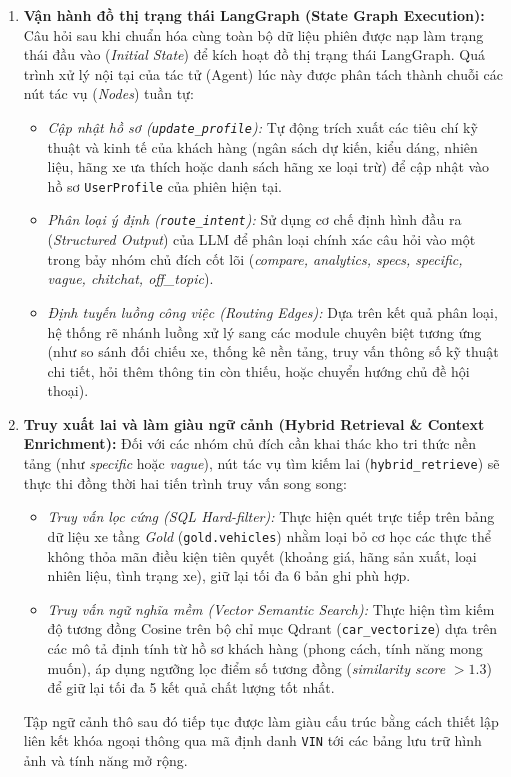 \begin{enumerate}
    \item \textbf{Vận hành đồ thị trạng thái LangGraph (State Graph Execution):} Câu hỏi sau khi chuẩn hóa cùng toàn bộ dữ liệu phiên được nạp làm trạng thái đầu vào (\textit{Initial State}) để kích hoạt đồ thị trạng thái LangGraph. Quá trình xử lý nội tại của tác tử (Agent) lúc này được phân tách thành chuỗi các nút tác vụ (\textit{Nodes}) tuần tự:
    \begin{itemize}
        \item \textit{Cập nhật hồ sơ (\texttt{update\_profile}):} Tự động trích xuất các tiêu chí kỹ thuật và kinh tế của khách hàng (ngân sách dự kiến, kiểu dáng, nhiên liệu, hãng xe ưa thích hoặc danh sách hãng xe loại trừ) để cập nhật vào hồ sơ \texttt{UserProfile} của phiên hiện tại.
        \item \textit{Phân loại ý định (\texttt{route\_intent}):} Sử dụng cơ chế định hình đầu ra (\textit{Structured Output}) của LLM để phân loại chính xác câu hỏi vào một trong bảy nhóm chủ đích cốt lõi (\textit{compare, analytics, specs, specific, vague, chitchat, off\_topic}).
        \item \textit{Định tuyến luồng công việc (Routing Edges):} Dựa trên kết quả phân loại, hệ thống rẽ nhánh luồng xử lý sang các module chuyên biệt tương ứng (như so sánh đối chiếu xe, thống kê nền tảng, truy vấn thông số kỹ thuật chi tiết, hỏi thêm thông tin còn thiếu, hoặc chuyển hướng chủ đề hội thoại).
    \end{itemize}
    
    \item \textbf{Truy xuất lai và làm giàu ngữ cảnh (Hybrid Retrieval \& Context Enrichment):} Đối với các nhóm chủ đích cần khai thác kho tri thức nền tảng (như \textit{specific} hoặc \textit{vague}), nút tác vụ tìm kiếm lai (\texttt{hybrid\_retrieve}) sẽ thực thi đồng thời hai tiến trình truy vấn song song:
    \begin{itemize}
        \item \textit{Truy vấn lọc cứng (SQL Hard-filter):} Thực hiện quét trực tiếp trên bảng dữ liệu xe tầng \textit{Gold} (\texttt{gold.vehicles}) nhằm loại bỏ cơ học các thực thể không thỏa mãn điều kiện tiên quyết (khoảng giá, hãng sản xuất, loại nhiên liệu, tình trạng xe), giữ lại tối đa 6 bản ghi phù hợp.
        \item \textit{Truy vấn ngữ nghĩa mềm (Vector Semantic Search):} Thực hiện tìm kiếm độ tương đồng Cosine trên bộ chỉ mục Qdrant (\texttt{car\_vectorize}) dựa trên các mô tả định tính từ hồ sơ khách hàng (phong cách, tính năng mong muốn), áp dụng ngưỡng lọc điểm số tương đồng (\textit{similarity score} $> 1.3$) để giữ lại tối đa 5 kết quả chất lượng tốt nhất.
    \end{itemize}
    Tập ngữ cảnh thô sau đó tiếp tục được làm giàu cấu trúc bằng cách thiết lập liên kết khóa ngoại thông qua mã định danh \texttt{VIN} tới các bảng lưu trữ hình ảnh và tính năng mở rộng.
    

\end{enumerate}
